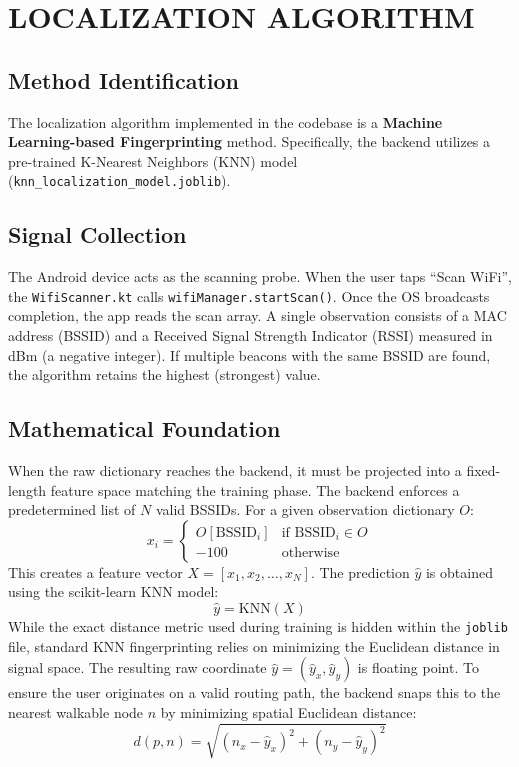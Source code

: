\documentclass[11pt,a4paper]{article}
\begin{document}
\section{LOCALIZATION ALGORITHM}
\subsection{Method Identification}
The localization algorithm implemented in the codebase is a \textbf{Machine Learning-based Fingerprinting} method. Specifically, the backend utilizes a pre-trained K-Nearest Neighbors (KNN) model (\texttt{knn\_localization\_model.joblib}).
\subsection{Signal Collection}
The Android device acts as the scanning probe. When the user taps ``Scan WiFi'', the \texttt{WifiScanner.kt} calls \texttt{wifiManager.startScan()}. Once the OS broadcasts completion, the app reads the scan array. A single observation consists of a MAC address (BSSID) and a Received Signal Strength Indicator (RSSI) measured in dBm (a negative integer). If multiple beacons with the same BSSID are found, the algorithm retains the highest (strongest) value.
\subsection{Mathematical Foundation}
When the raw dictionary reaches the backend, it must be projected into a fixed-length feature space matching the training phase. The backend enforces a predetermined list of $N$ valid BSSIDs. For a given observation dictionary $O$:
\begin{equation}
x_i = \begin{cases} O[\text{BSSID}_i] & \text{if } \text{BSSID}_i \in O \\ -100 & \text{otherwise} \end{cases}
\end{equation}
This creates a feature vector $X = [x_1, x_2, \ldots, x_N]$.
The prediction $\hat{y}$ is obtained using the scikit-learn KNN model:
\begin{equation}
\hat{y} = \mathrm{KNN}(X)
\end{equation}
While the exact distance metric used during training is hidden within the \texttt{joblib} file, standard KNN fingerprinting relies on minimizing the Euclidean distance in signal space.
The resulting raw coordinate $\hat{y} = (\hat{y}_x, \hat{y}_y)$ is floating point. To ensure the user originates on a valid routing path, the backend snaps this to the nearest walkable node $n$ by minimizing spatial Euclidean distance:
\begin{equation}
d(p, n) = \sqrt{(n_x - \hat{y}_x)^2 + (n_y - \hat{y}_y)^2}
\end{equation}
\end{document}
